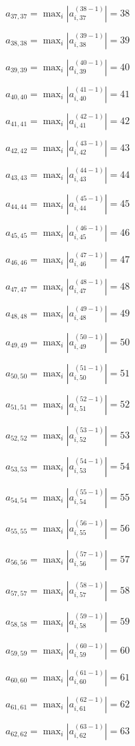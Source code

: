 \documentclass[a4paper,12pt]{article}
\begin{document}
$a _{ 37, 37 } =  \max _i |a _{ i, 37 } ^{ (38 - 1) } | = 38$

$a _{ 38, 38 } =  \max _i |a _{ i, 38 } ^{ (39 - 1) } | = 39$

$a _{ 39, 39 } =  \max _i |a _{ i, 39 } ^{ (40 - 1) } | = 40$

$a _{ 40, 40 } =  \max _i |a _{ i, 40 } ^{ (41 - 1) } | = 41$

$a _{ 41, 41 } =  \max _i |a _{ i, 41 } ^{ (42 - 1) } | = 42$

$a _{ 42, 42 } =  \max _i |a _{ i, 42 } ^{ (43 - 1) } | = 43$

$a _{ 43, 43 } =  \max _i |a _{ i, 43 } ^{ (44 - 1) } | = 44$

$a _{ 44, 44 } =  \max _i |a _{ i, 44 } ^{ (45 - 1) } | = 45$

$a _{ 45, 45 } =  \max _i |a _{ i, 45 } ^{ (46 - 1) } | = 46$

$a _{ 46, 46 } =  \max _i |a _{ i, 46 } ^{ (47 - 1) } | = 47$

$a _{ 47, 47 } =  \max _i |a _{ i, 47 } ^{ (48 - 1) } | = 48$

$a _{ 48, 48 } =  \max _i |a _{ i, 48 } ^{ (49 - 1) } | = 49$

$a _{ 49, 49 } =  \max _i |a _{ i, 49 } ^{ (50 - 1) } | = 50$

$a _{ 50, 50 } =  \max _i |a _{ i, 50 } ^{ (51 - 1) } | = 51$

$a _{ 51, 51 } =  \max _i |a _{ i, 51 } ^{ (52 - 1) } | = 52$

$a _{ 52, 52 } =  \max _i |a _{ i, 52 } ^{ (53 - 1) } | = 53$

$a _{ 53, 53 } =  \max _i |a _{ i, 53 } ^{ (54 - 1) } | = 54$

$a _{ 54, 54 } =  \max _i |a _{ i, 54 } ^{ (55 - 1) } | = 55$

$a _{ 55, 55 } =  \max _i |a _{ i, 55 } ^{ (56 - 1) } | = 56$

$a _{ 56, 56 } =  \max _i |a _{ i, 56 } ^{ (57 - 1) } | = 57$

$a _{ 57, 57 } =  \max _i |a _{ i, 57 } ^{ (58 - 1) } | = 58$

$a _{ 58, 58 } =  \max _i |a _{ i, 58 } ^{ (59 - 1) } | = 59$

$a _{ 59, 59 } =  \max _i |a _{ i, 59 } ^{ (60 - 1) } | = 60$

$a _{ 60, 60 } =  \max _i |a _{ i, 60 } ^{ (61 - 1) } | = 61$

$a _{ 61, 61 } =  \max _i |a _{ i, 61 } ^{ (62 - 1) } | = 62$

$a _{ 62, 62 } =  \max _i |a _{ i, 62 } ^{ (63 - 1) } | = 63$
\end{document}
